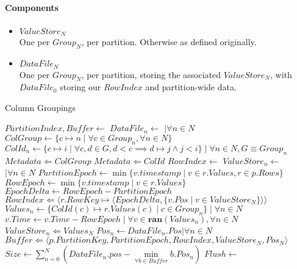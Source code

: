 \documentclass[fleqn]{article}
\begin{document}
\paragraph{Components}
\begin{itemize}
  \item $ValueStore_N$\\[2pt]
    One per $Group_N$, per partition. Otherwise as defined originally.
  \item $DataFile_N$\\[2pt]
    One per $Group_N$, per partition, storing the associated $ValueStore_N$, with $DataFile_0$ 
    storing our $RowIndex$ and partition-wide data.
\end{itemize}

\begin{algorithm}
\scriptsize
\caption{Column Groupings}
\begin{algorithmic}[1]
\State $PartitionIndex, Buffer \gets $ 
\State $DataFile_{n} \gets $  $\mid \forall n \in N$
\Statex
\State $ColGroup \gets \{c \mapsto n \mid \forall c \in Group_{n}, \forall n \in N \}$
\State $ColId_{n} \gets \{c \mapsto i \mid \forall c, d \in G, d < c \implies d \mapsto j \wedge j < i \} \mid \forall n \in N, G \equiv Group_{n}$
\State $Metadata \Leftarrow ColGroup$
\State $Metadata \Leftarrow ColId$
\Statex
{} 
 \State $RowIndex \gets $ 
 \State $ValueStore_{n} \gets $  $ \mid \forall n \in N$
 \State $PartitionEpoch \gets \min \{v.timestamp \mid v \in r.Values, r \in p.Rows\}$
 \Statex
   \State $RowEpoch \gets \min \{v.timestamp \mid v \in r.Values\}$
   \State $EpochDelta \gets RowEpoch - PartitionEpoch$
   \State $RowIndex \Leftarrow \langle r.RowKey \mapsto \langle EpochDelta, \{ v.Pos \mid v \in ValueStore_{N} \}\rangle \rangle $ 
   \State $Values_{n} \gets \{ ColId(c) \mapsto r.Values(c) \mid c \in Group_{n} \} \mid \forall n \in N$
   \State $v.Time \gets v.Time - RowEpoch \mid \forall v \in \mathbf{ran}(Values_{n}), \forall n \in N$
   \State $ ValueStore_{n} \Leftarrow Values_{N} $
 \EndFor
\Statex
 \State $Pos_{n} \gets DataFile_{n}.Pos | \forall n \in N$
 \State $Buffer \Leftarrow \langle p.PartitionKey, PartitionEpoch, RowIndex, ValueStore_{N}, Pos_{N} \rangle$
 \State $Size \gets \sum\limits_{n=0}^{N} (DataFile_{n}.pos - \min\limits_{\forall b \in Buffer} b.Pos_{n}) $
   \State $Flush \gets$ 
   \State {}

\end{algorithmic}
\end{algorithm}
\end{document}
